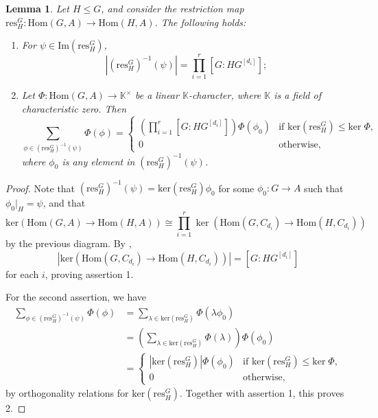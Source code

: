 \documentclass[letterpaper,12pt]{article}
\theoremstyle{plain}
\newtheorem{lemma}[theorem]{Lemma}
\theoremstyle{definition}
\newcommand{\K}{\mathbb{K}}
\begin{document}
\begin{lemma}
    Let $H\leq G$, and consider the restriction map $\mathrm{res}^G_H:\mathrm{Hom}(G,A)\longrightarrow \mathrm{Hom}(H,A)$. The following holds:
    \begin{enumerate}
        \item For $\psi\in \mathrm{Im}\left(\mathrm{res}^G_H\right)$, 
        $$\left|\left(\mathrm{res}^G_H\right)^{-1}(\psi)\right|=\prod_{i=1}^r\left[G:HG^{[d_i]}\right];$$
        \item Let $\Phi:\mathrm{Hom}(G,A)\longrightarrow \K^{\times}$ be a linear $\K$-character, where $\K$ is a field of characteristic zero. Then
        $$\sum_{\phi\in \left(\mathrm{res}^G_H\right)^{-1}(\psi)}\Phi(\phi)=\begin{cases}
            \left(\prod_{i=1}^r\left[G:HG^{[d_i]}\right]\right)\Phi(\phi_0) &\text{if }\mathrm{ker}\left(\mathrm{res}^G_H\right)\leq \mathrm{ker}\;\Phi,\\
            0 &\text{otherwise,}
        \end{cases}$$
        where $\phi_0$ is any element in $\left(\mathrm{res}^G_H\right)^{-1}(\psi)$.
    \end{enumerate}
\end{lemma}
\begin{proof}
    Note that $\left(\mathrm{res}^G_H\right)^{-1}(\psi)=\mathrm{ker}\left(\mathrm{res}^G_H\right)\phi_0$ for some $\phi_0:G\longrightarrow A$ such that $\phi_0|_H=\psi$, and that
    $$\mathrm{ker}\left(\mathrm{Hom}(G,A)\to \mathrm{Hom}(H,A)\right)\cong \prod_{i=1}^r\ker\left(\mathrm{Hom}(G,C_{d_i})\to \mathrm{Hom}(H,C_{d_i})\right)$$
    by the previous diagram. By \cite[Lemma 5.3]{GarRag}, 
    $$\left|\mathrm{ker}\left(\mathrm{Hom}\left(G,C_{d_i}\right)\to \mathrm{Hom}\left(H,C_{d_i}\right)\right)\right|=\left[G:HG^{[d_i]}\right]$$
    for each $i$, proving assertion 1. 
    
    For the second assertion, we have
    \begin{align*}
        \sum_{\phi\in \left(\mathrm{res}^G_H\right)^{-1}(\psi)}\Phi(\phi) 
        &=\sum_{\lambda \in \mathrm{ker}\left(\mathrm{res}^G_H\right)}\Phi(\lambda\phi_0)\\
        &=\left(\sum_{\lambda\in \mathrm{ker}\left(\mathrm{res}^G_H\right)}\Phi(\lambda)\right)\Phi(\phi_0)\\
        &=\begin{cases}
            \left|\mathrm{ker}\left(\mathrm{res}^G_H\right)\right|\Phi(\phi_0) &\text{if }\mathrm{ker}\left(\mathrm{res}^G_H\right)\leq \mathrm{ker}\;\Phi,\\
            0 &\text{otherwise,}
        \end{cases}
    \end{align*}
    by orthogonality relations for $\mathrm{ker}\left(\mathrm{res}^G_H\right)$. Together with assertion 1, this proves 2.
\end{proof}
\end{document}
